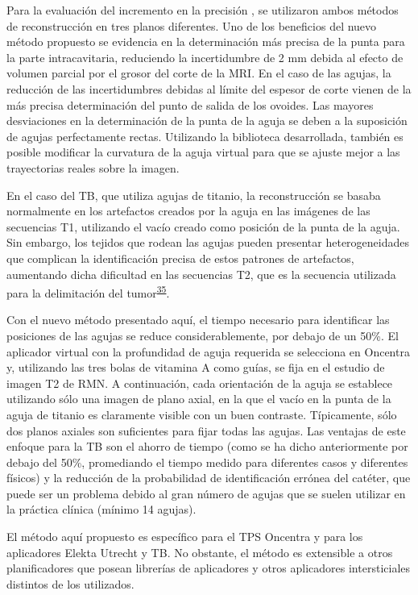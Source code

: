 \documentclass[
  a4paper,
]{scrreprt}
\begin{document}
Para la evaluación del incremento en la precisión , se utilizaron ambos
métodos de reconstrucción en tres planos diferentes. Uno de los
beneficios del nuevo método propuesto se evidencia en la determinación
más precisa de la punta para la parte intracavitaria, reduciendo la
incertidumbre de 2 mm debida al efecto de volumen parcial por el grosor
del corte de la MRI. En el caso de las agujas, la reducción de las
incertidumbres debidas al límite del espesor de corte vienen de la más
precisa determinación del punto de salida de los ovoides. Las mayores
desviaciones en la determinación de la punta de la aguja se deben a la
suposición de agujas perfectamente rectas. Utilizando la biblioteca
desarrollada, también es posible modificar la curvatura de la aguja
virtual para que se ajuste mejor a las trayectorias reales sobre la
imagen.

En el caso del TB, que utiliza agujas de titanio, la reconstrucción se
basaba normalmente en los artefactos creados por la aguja en las
imágenes de las secuencias T1, utilizando el vacío creado como posición
de la punta de la aguja. Sin embargo, los tejidos que rodean las agujas
pueden presentar heterogeneidades que complican la identificación
precisa de estos patrones de artefactos, aumentando dicha dificultad en
las secuencias T2, que es la secuencia utilizada para la delimitación
del tumor\textsuperscript{\protect\hyperlink{ref-dimopoulos2012}{35}}.

Con el nuevo método presentado aquí, el tiempo necesario para
identificar las posiciones de las agujas se reduce considerablemente,
por debajo de un 50\%. El aplicador virtual con la profundidad de aguja
requerida se selecciona en Oncentra y, utilizando las tres bolas de
vitamina A como guías, se fija en el estudio de imagen T2 de RMN. A
continuación, cada orientación de la aguja se establece utilizando sólo
una imagen de plano axial, en la que el vacío en la punta de la aguja de
titanio es claramente visible con un buen contraste. Típicamente, sólo
dos planos axiales son suficientes para fijar todas las agujas. Las
ventajas de este enfoque para la TB son el ahorro de tiempo (como se ha
dicho anteriormente por debajo del 50\%, promediando el tiempo medido
para diferentes casos y diferentes físicos) y la reducción de la
probabilidad de identificación errónea del catéter, que puede ser un
problema debido al gran número de agujas que se suelen utilizar en la
práctica clínica (mínimo 14 agujas).

El método aquí propuesto es específico para el TPS Oncentra y para los
aplicadores Elekta Utrecht y TB. No obstante, el método es extensible a
otros planificadores que posean librerías de aplicadores y otros
aplicadores intersticiales distintos de los utilizados.
\end{document}
